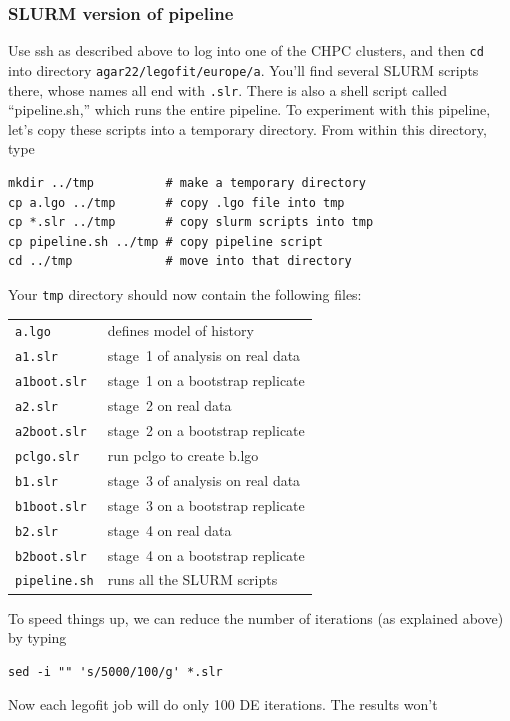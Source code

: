 \documentclass[11pt]{article}
\begin{document}
\subsubsection{SLURM version of pipeline}
\label{sec.slurmpipe}
Use ssh as described above to log into one of the CHPC clusters, and
then \texttt{cd} into directory
\texttt{agar22/legofit/europe/a}. You'll find several SLURM scripts
there, whose names all end with \texttt{.slr}. There is also a shell
script called ``pipeline.sh,'' which runs the entire pipeline.  To
experiment with this pipeline, let's copy these scripts into a
temporary directory. From within this directory, type
\begin{verbatim}
mkdir ../tmp          # make a temporary directory
cp a.lgo ../tmp       # copy .lgo file into tmp
cp *.slr ../tmp       # copy slurm scripts into tmp
cp pipeline.sh ../tmp # copy pipeline script
cd ../tmp             # move into that directory
\end{verbatim}
Your \texttt{tmp} directory should now contain the following files:
\begin{center}
  \begin{tabular}{ll}
\texttt{a.lgo} & defines model of history\\    
\texttt{a1.slr} & stage~1 of analysis on real data\\
\texttt{a1boot.slr} & stage~1 on a bootstrap replicate\\
\texttt{a2.slr} & stage~2 on real data\\
\texttt{a2boot.slr} & stage~2 on a bootstrap replicate\\
\texttt{pclgo.slr} & run pclgo to create b.lgo  \\
\texttt{b1.slr} & stage~3 of analysis on real data\\
\texttt{b1boot.slr} & stage~3 on a bootstrap replicate\\
\texttt{b2.slr} & stage~4 on real data\\
\texttt{b2boot.slr} & stage~4 on a bootstrap replicate\\
\verb|pipeline.sh| & runs all the SLURM scripts\\
\end{tabular}
\end{center}
To speed things up, we can reduce the number of iterations (as
explained above) by typing
\begin{verbatim}
sed -i "" 's/5000/100/g' *.slr 
\end{verbatim}
Now each legofit job will do only 100 DE iterations. The results won't
\end{document}
